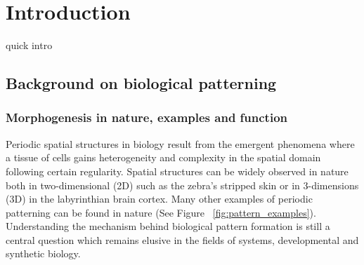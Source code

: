 
\chapter{Introduction}

quick intro
\section{Background on biological patterning}
\subsection{Morphogenesis in nature, examples and function}
Periodic spatial structures in biology result from the emergent phenomena where a tissue of cells gains heterogeneity and complexity in the spatial domain following certain regularity.
Spatial structures can be widely observed in nature both in two-dimensional (2D) such as the zebra's stripped skin or in 3-dimensions (3D) in the labyrinthian brain cortex.
Many other examples of periodic patterning can be found in nature (See Figure ~\ref{fig:pattern_examples}).
Understanding the mechanism behind biological pattern formation is still a central question which remains elusive in the fields of systems, developmental and synthetic biology.  %

